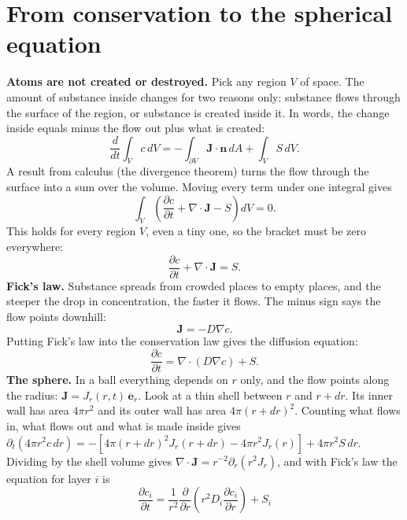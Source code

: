\documentclass[11pt]{article}
\begin{document}
\section{From conservation to the spherical equation}
\textbf{Atoms are not created or destroyed.} Pick any region $V$ of space. The amount of substance inside changes for two reasons only: substance flows through the surface of the region, or substance is created inside it. In words, the change inside equals minus the flow out plus what is created:
\begin{equation}
\frac{d}{dt}\int_V c\,dV=-\int_{\partial V}\mathbf J\cdot\mathbf n\,dA+\int_V S\,dV.
\tag{TRISO-GOV-020}
\end{equation}
A result from calculus (the divergence theorem) turns the flow through the surface into a sum over the volume. Moving every term under one integral gives
\[
\int_V\left(\frac{\partial c}{\partial t}+\nabla\cdot\mathbf J-S\right)dV=0 .
\]
This holds for every region $V$, even a tiny one, so the bracket must be zero everywhere:
\begin{equation}
\frac{\partial c}{\partial t}+\nabla\cdot\mathbf J=S.
\tag{TRISO-GOV-030}
\end{equation}
\textbf{Fick's law.} Substance spreads from crowded places to empty places, and the steeper the drop in concentration, the faster it flows. The minus sign says the flow points downhill:
\begin{equation}
\mathbf J=-D\nabla c.
\tag{TRISO-GOV-034}
\end{equation}
Putting Fick's law into the conservation law gives the diffusion equation:
\begin{equation}
\frac{\partial c}{\partial t}=\nabla\cdot(D\nabla c)+S.
\tag{TRISO-GOV-040}
\end{equation}
\textbf{The sphere.} In a ball everything depends on $r$ only, and the flow points along the radius: $\mathbf J=J_r(r,t)\,\mathbf e_r$. Look at a thin shell between $r$ and $r+dr$. Its inner wall has area $4\pi r^2$ and its outer wall has area $4\pi(r+dr)^2$. Counting what flows in, what flows out and what is made inside gives
$\partial_t(4\pi r^2c\,dr)=-\left[4\pi(r+dr)^2J_r(r+dr)-4\pi r^2J_r(r)\right]+4\pi r^2S\,dr$. Dividing by the shell volume gives $\nabla\cdot\mathbf J=r^{-2}\partial_r(r^2J_r)$, and with Fick's law the equation for layer $i$ is
\begin{equation}
\boxed{\frac{\partial c_i}{\partial t}=\frac{1}{r^2}\frac{\partial}{\partial r}\left(r^2D_i\frac{\partial c_i}{\partial r}\right)+S_i}
\tag{TRISO-FV-100}
\end{equation}
\end{document}
